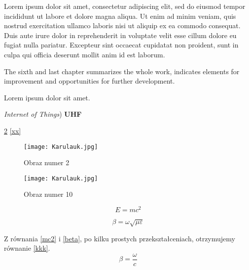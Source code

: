 \par Lorem ipsum dolor sit amet, consectetur adipiscing elit, sed do eiusmod tempor incididunt ut labore et dolore magna aliqua. Ut enim ad minim veniam, quis nostrud exercitation ullamco laboris nisi ut aliquip ex ea commodo consequat. Duis aute irure dolor in reprehenderit in voluptate velit esse cillum dolore eu fugiat nulla pariatur. Excepteur sint occaecat cupidatat non proident, sunt in culpa qui officia deserunt mollit anim id est laborum.
\par The sixth and last chapter summarizes the whole work, indicates elements for improvement and opportunities for further development.
\newline
\newline %
\par Lorem ipsum dolor sit amet.

\textit{Internet of Things}) %
\textbf{UHF} %

\cite{bibelment} %
\ref{figure10} %
\eqref{xx} %


\begin{figure}[H]
  \centering
  \texttt{[image: Karulauk.jpg]}
  \caption{Obraz numer 2}
  \label{figure:example1}
\end{figure}

\begin{figure}[H]
  \centering
  \texttt{[image: Karulauk.jpg]}
  \caption{Obraz numer 10}
  \label{figure10}
\end{figure}


\begin{equation} \label{mc2}
E = mc^2
\end{equation}

\begin{equation} \label{beta}
\beta = \omega\sqrt{\mu\varepsilon}
\end{equation}

Z równania \eqref{mc2} i \eqref{beta}, po kilku prostych przekształceniach, otrzymujemy równanie \eqref{kkk}.
\begin{equation} \label{kkk}
\beta = \frac{\omega}{c}
\end{equation}

